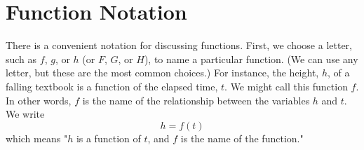 \documentclass[10pt,]{book}
\theoremstyle{plain}
\theoremstyle{definition}
\theoremstyle{definition}
\theoremstyle{definition}
\theoremstyle{definition}
\numberwithin{equation}{section}
\let\oldsection\section
\renewcommand\section{\znewpage\oldsection}
\begin{document}
\section[{Function Notation}]{Function Notation}\label{subsection-5}
\hypertarget{p-48}{}%
There is a convenient notation for discussing functions. First, we choose a letter, such as \(f\), \(g\), or \(h\) (or \(F\), \(G\), or \(H\)), to name a particular function. (We can use any letter, but these are the most common choices.) For instance, the height, \(h\), of a falling textbook is a function of the elapsed time, \(t\). We might call this function \(f\). In other words, \(f\) is the name of the relationship between the variables \(h\) and \(t\). We write%
\begin{equation*}
h = f (t)
\end{equation*}
which means "\(h\) is a function of \(t\), and \(f\) is the name of the function."%
\end{document}

